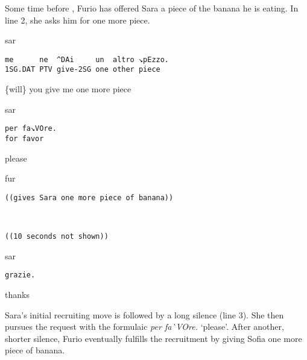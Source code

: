 \documentclass[output=paper,modfonts]{langscibook}
\begin{document}
Some time before , Furio has offered Sara a piece of the banana he is eating. In line 2, she asks him for one more piece.

\vspace{2mm}
%
%
\begin{mdframednoverticalspace}[style=firstfoc]
\begin{transbox}{2}{sar}
\begin{verbatim}
me      ne  ^DAi     un  altro ↘pEzzo.
1SG.DAT PTV give-2SG one other piece
\end{verbatim}
\{will\} you give me one more piece
\end{transbox}
\end{mdframednoverticalspace}\vspace{1.5mm}
%
%
\begin{mdframednoverticalspace}[style=firstfoc]
\begin{transbox}{4}{sar}
\begin{verbatim}
per fa↘VOre.
for favor
\end{verbatim}
please
\end{transbox}
\end{mdframednoverticalspace}\vspace{1.25mm}
%
\vspace{-0.25mm}
%
\begin{mdframednoverticalspace}[style=secondfoc]
\begin{transbox}{6}{fur}
\begin{verbatim}
((gives Sara one more piece of banana))
\end{verbatim}
\end{transbox}
\end{mdframednoverticalspace}\vspace{0.5mm}
%
\begin{transbox}{~}{~}
\begin{verbatim}
((10 seconds not shown))
\end{verbatim}
\end{transbox}\vspace{-1.75mm}
%
\begin{transbox}{7}{sar}
\begin{verbatim}
grazie.
\end{verbatim}
thanks
\end{transbox}\bigskip

Sara's initial recruiting move is followed by a long silence (line 3). She then pursues the request with the formulaic \textit{per fa\`{}VOre.} ‘please’. After another, shorter silence, Furio eventually fulfills the recruitment by giving Sofia one more piece of banana.
\end{document}
